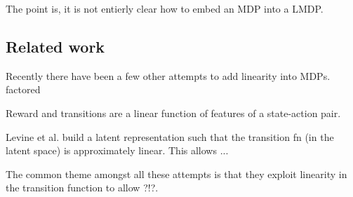 The point is, it is not entierly clear how to embed an MDP into a LMDP.


\subsection{Related work}

Recently there have been a few other attempts to add linearity into MDPs.
\cite{Pires2016} factored

\cite{Wang} Reward and transitions are a linear function of features of a state-action pair.

Levine et al. \cite{Levine2019} build a latent representation such that the transition fn (in the latent space) is approximately linear. This allows ...

The common theme amongst all these attempts is that they exploit linearity in the transition function to allow ?!?.
